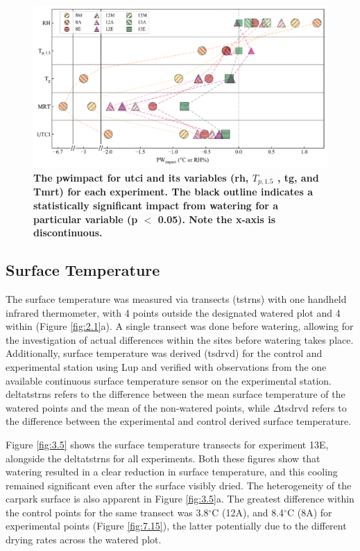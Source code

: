 \documentclass[final,3p,times,authoryear]{elsarticle}
\begin{document}
\begin{figure}
\centering
\includegraphics[trim={0 0 0 0},clip,scale=1.0]{pict015.png}
\caption{\bf The \gls{pwimpact} for \gls{utci} and its variables (\gls{rh}, $T_{p,1.5}$ , \gls{tg}, and \gls{Tmrt}) for each experiment. The black outline indicates a statistically significant impact from watering for a particular variable (\gls{p} $<$ 0.05). Note the x-axis is discontinuous.}
 \label{fig:3.4}
\end{figure}


\subsection{Surface Temperature}\label{sec:discussion3.3}

The surface temperature was measured via transects (\gls{tstrns}) with one handheld infrared
thermometer, with 4 points outside the designated watered plot and 4 within (Figure
\ref{fig:2.1}a). A single transect was done before watering, allowing for the investigation of actual differences within the sites before watering takes place. Additionally, surface
temperature was derived (\gls{tsdrvd}) for the control and experimental station using \gls{Lup} and verified with observations from the one available continuous surface temperature sensor on the experimental station. \gls{deltatstrns} refers to the difference between the mean surface temperature of the watered points and the mean of the non-watered points, while $\Delta$\gls{tsdrvd} refers to the difference between the experimental and control derived surface temperature.

Figure \ref{fig:3.5} shows the surface temperature transects for experiment 13E, alongside the \gls{deltatstrns} for all experiments. Both these figures show that watering resulted in a clear reduction in surface temperature, and this cooling remained significant even after the surface visibly dried. The heterogeneity of the carpark surface is also apparent in Figure \ref{fig:3.5}a. The greatest difference within the control points for the same transect was 3.8$^{\circ}$C (12A), and 8.4$^{\circ}$C (8A) for experimental points (Figure \ref{fig:7.15}), the latter potentially due to the different drying rates across the watered plot.
\end{document}
